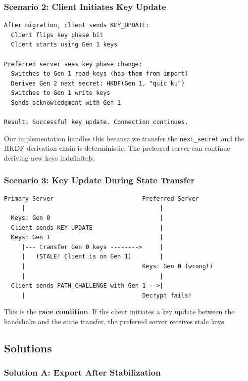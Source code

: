 \documentclass[11pt,a4paper]{article}
\begin{document}
\subsubsection{Scenario 2: Client Initiates Key Update}

\begin{lstlisting}
After migration, client sends KEY_UPDATE:
  Client flips key phase bit
  Client starts using Gen 1 keys

Preferred server sees key phase change:
  Switches to Gen 1 read keys (has them from import)
  Derives Gen 2 next secret: HKDF(Gen 1, "quic ku")
  Switches to Gen 1 write keys
  Sends acknowledgment with Gen 1

Result: Successful key update. Connection continues.
\end{lstlisting}

Our implementation handles this because we transfer the \texttt{next\_secret} and the HKDF derivation chain is deterministic. The preferred server can continue deriving new keys indefinitely.

\subsubsection{Scenario 3: Key Update During State Transfer}

\begin{lstlisting}
Primary Server                         Preferred Server
     |                                      |
  Keys: Gen 0                               |
  Client sends KEY_UPDATE                   |
  Keys: Gen 1                               |
     |--- transfer Gen 0 keys -------->     |
     |   (STALE! Client is on Gen 1)        |
     |                                 Keys: Gen 0 (wrong!)
     |                                      |
  Client sends PATH_CHALLENGE with Gen 1 -->|
     |                                 Decrypt fails!
\end{lstlisting}

This is the \textbf{race condition}. If the client initiates a key update between the handshake and the state transfer, the preferred server receives stale keys.

\subsection{Solutions}

\subsubsection{Solution A: Export After Stabilization}
\end{document}
